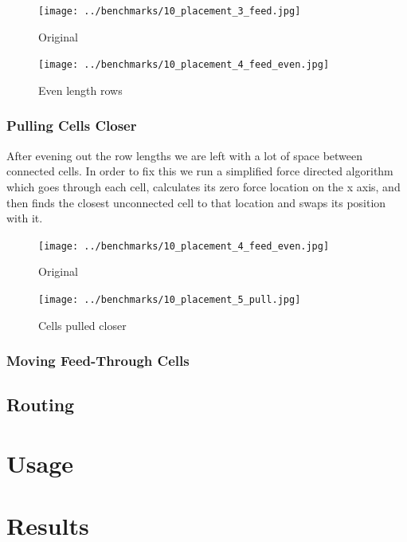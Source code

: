 \documentclass[10pt]{article}
\begin{document}
        \begin{figure}[H]
            \centering
            \texttt{[image: ../benchmarks/10\_placement\_3\_feed.jpg]}
            \caption{Original}
        \end{figure}
        \begin{figure}[H]
            \centering
            \texttt{[image: ../benchmarks/10\_placement\_4\_feed\_even.jpg]}
            \caption{Even length rows}
        \end{figure}

        \subsubsection{Pulling Cells Closer}

        After evening out the row lengths we are left with a lot of space
        between connected cells. In order to fix this we run a simplified force
        directed algorithm which goes through each cell, calculates its zero
        force location on the x axis, and then finds the closest unconnected
        cell to that location and swaps its position with it.

        \begin{figure}[H]
            \centering
            \texttt{[image: ../benchmarks/10\_placement\_4\_feed\_even.jpg]}
            \caption{Original}
        \end{figure}
        \begin{figure}[H]
            \centering
            \texttt{[image: ../benchmarks/10\_placement\_5\_pull.jpg]}
            \caption{Cells pulled closer}
        \end{figure}

        \subsubsection{Moving Feed-Through Cells}


\subsection{Routing}

\newpage
\section{Usage}


\newpage
\section{Results}
\end{document}
